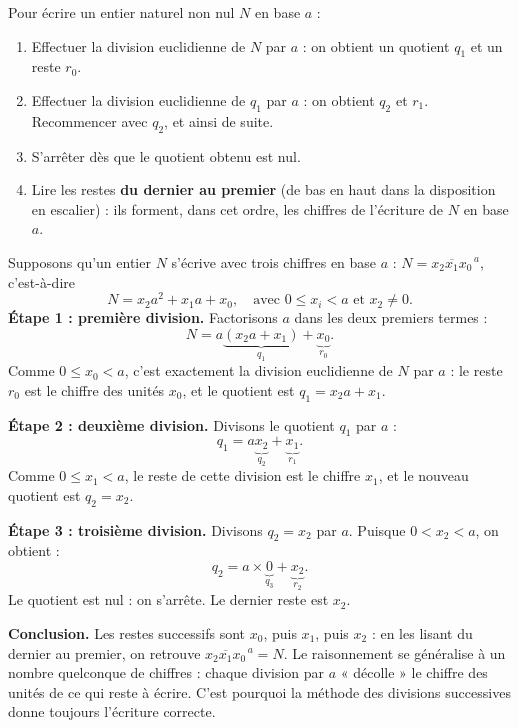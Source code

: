 \documentclass[11pt]{article}
\begin{document}
\begin{methode}
Pour écrire un entier naturel non nul $N$ en base $a$ :
\begin{enumerate}
\item Effectuer la division euclidienne de $N$ par $a$ : on obtient un quotient $q_1$ et un reste $r_0$.
\item Effectuer la division euclidienne de $q_1$ par $a$ : on obtient $q_2$ et $r_1$. Recommencer avec $q_2$, et ainsi de suite.
\item S'arrêter dès que le quotient obtenu est nul.
\item Lire les restes \textbf{du dernier au premier} (de bas en haut dans la disposition en escalier) : ils forment, dans cet ordre, les chiffres de l'écriture de $N$ en base $a$.
\end{enumerate}
\end{methode}

\begin{experience}
Supposons qu'un entier $N$ s'écrive avec trois chiffres en base $a$ : $N = \overline{x_2 x_1 x_0}^{\,a}$, c'est-à-dire
\[ N = x_2 a^2 + x_1 a + x_0, \quad \text{avec } 0 \le x_i < a \text{ et } x_2 \ne 0. \]
\textbf{Étape 1 : première division.} Factorisons $a$ dans les deux premiers termes :
\[ N = a \underbrace{(x_2 a + x_1)}_{q_1} + \underbrace{x_0}_{r_0}. \]
Comme $0 \le x_0 < a$, c'est exactement la division euclidienne de $N$ par $a$ : le reste $r_0$ est le chiffre des unités $x_0$, et le quotient est $q_1 = x_2 a + x_1$.

\textbf{Étape 2 : deuxième division.} Divisons le quotient $q_1$ par $a$ :
\[ q_1 = a \underbrace{x_2}_{q_2} + \underbrace{x_1}_{r_1}. \]
Comme $0 \le x_1 < a$, le reste de cette division est le chiffre $x_1$, et le nouveau quotient est $q_2 = x_2$.

\textbf{Étape 3 : troisième division.} Divisons $q_2 = x_2$ par $a$. Puisque $0 < x_2 < a$, on obtient :
\[ q_2 = a \times \underbrace{0}_{q_3} + \underbrace{x_2}_{r_2}. \]
Le quotient est nul : on s'arrête. Le dernier reste est $x_2$.

\textbf{Conclusion.} Les restes successifs sont $x_0$, puis $x_1$, puis $x_2$ : en les lisant du dernier au premier, on retrouve $\overline{x_2 x_1 x_0}^{\,a} = N$. Le raisonnement se généralise à un nombre quelconque de chiffres : chaque division par $a$ « décolle » le chiffre des unités de ce qui reste à écrire. C'est pourquoi la méthode des divisions successives donne toujours l'écriture correcte.
\end{experience}
\end{document}
